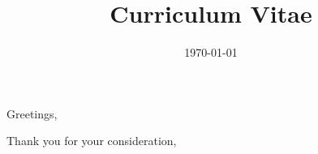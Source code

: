 \documentclass[12pt,a4paper,sans]{moderncv} %
\title{Curriculum Vitae}
\begin{document}



\clearpage

\date{\today} %
\opening{Greetings,} %




\closing{Thank you for your consideration,} %

\makelettertitle 



\end{document}
